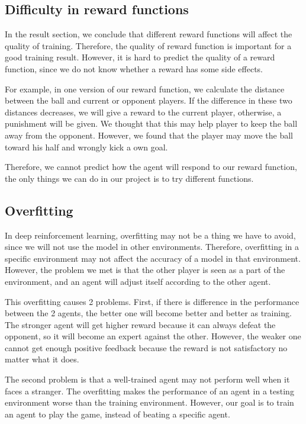 \documentclass[12pt]{article}
\begin{document}
\subsection{Difficulty in reward functions}

In the result section, we conclude that different reward functions will affect the quality of training. Therefore, the quality of reward function is important for a good training result. However, it is hard to predict the quality of a reward function, since we do not know whether a reward has some side effects. 

For example, in one version of our reward function, we calculate the distance between the ball and current or opponent players. If the difference in these two distances decreases, we will give a reward to the current player, otherwise, a punishment will be given. We thought that this may help player to keep the ball away from the opponent. However, we found that the player may move the ball toward his half and wrongly kick a own goal.

Therefore, we cannot predict how the agent will respond to our reward function, the only things we can do in our project is to try different functions.

\subsection{Overfitting}

In deep reinforcement learning, overfitting may not be a thing we have to avoid, since we will not use the model in other environments. Therefore, overfitting in a specific environment may not affect the accuracy of a model in that environment. However, the problem we met is that the other player is seen as a part of the environment, and an agent will adjust itself according to the other agent.

This overfitting causes 2 problems. First, if there is difference in the performance between the 2 agents, the better one will become better and better as training. The stronger agent will get higher reward because it can always defeat the opponent, so it will become an expert against the other. However, the weaker one cannot get enough positive feedback because the reward is not satisfactory no matter what it does.

The second problem is that a well-trained agent may not perform well when it faces a stranger. The overfitting makes the performance of an agent in a testing environment worse than the training environment. However, our goal is to train an agent to play the game, instead of beating a specific agent.
\end{document}
